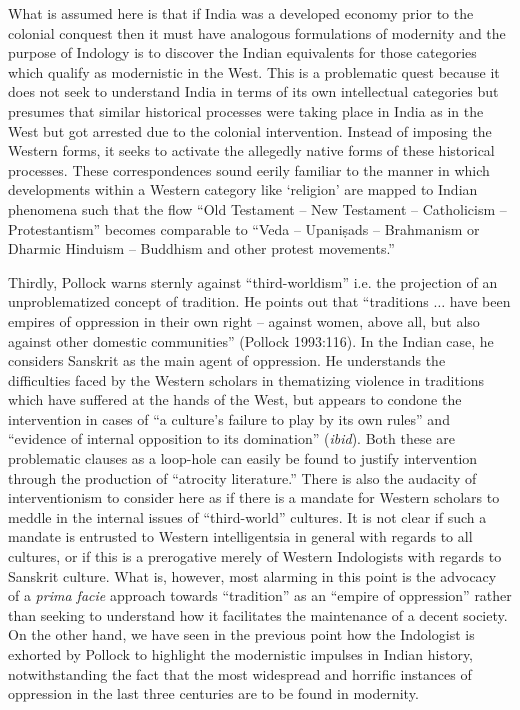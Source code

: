 What is assumed here is that if India was a developed economy prior to the colonial conquest then it must have analogous formulations of modernity and the purpose of Indology is to discover the Indian equivalents for those categories which qualify as modernistic in the West. This is a problematic quest because it does not seek to understand India in terms of its own intellectual categories but presumes that similar historical processes were taking place in India as in the West but got arrested due to the colonial intervention. Instead of imposing the Western forms, it seeks to activate the allegedly native forms of these historical processes. These correspondences sound eerily familiar to the manner in which developments within a Western category like ‘religion’ are mapped to Indian phenomena such that the flow “Old Testament – New Testament – Catholicism – Protestantism” becomes comparable to “Veda – Upaniṣads – Brahmanism or Dharmic Hinduism – Buddhism and other protest movements.”


Thirdly, Pollock warns sternly against “third-worldism” i.e. the projection of an unproblematized concept of tradition. He points out that “traditions $\ldots$ have been empires of oppression in their own right – against women, above all, but also against other domestic communities” (Pollock 1993:116). In the Indian case, he considers Sanskrit as the main agent of oppression. He understands the difficulties faced by the Western scholars in thematizing violence in traditions which have suffered at the hands of the West, but appears to condone the intervention in cases of “a culture’s failure to play by its own rules” and “evidence of internal opposition to its domination” ({\sl ibid}). Both these are problematic clauses as a loop-hole can easily be found to justify intervention through the production of “atrocity literature.” There is also the audacity of interventionism to consider here as if there is a mandate for Western scholars to meddle in the internal issues of “third-world” cultures. It is not clear if such a mandate is entrusted to Western intelligentsia in general with regards to all cultures, or if this is a prerogative merely of Western Indologists with regards to Sanskrit culture. What is, however, most alarming in this point is the advocacy of a {\sl prima facie} approach towards “tradition” as an “empire of oppression” rather than seeking to understand how it facilitates the maintenance of a decent society. On the other hand, we have seen in the previous point how the Indologist is exhorted by Pollock to highlight the modernistic impulses in Indian history, notwithstanding the fact that the most widespread and horrific instances of oppression in the last three centuries are to be found in modernity.

